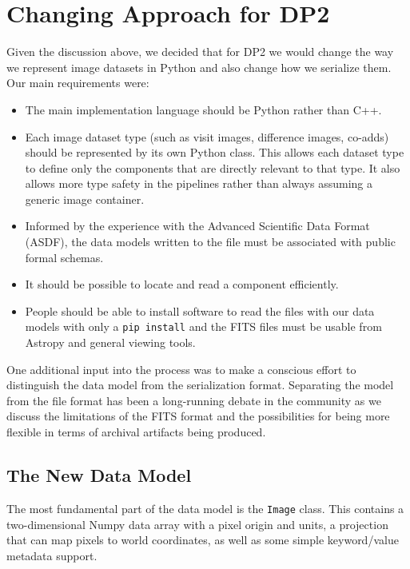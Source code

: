 \section{Changing Approach for DP2}

Given the discussion above, we decided that for DP2 we would change the way we represent image datasets in Python and also change how we serialize them.
Our main requirements were:

\begin{itemize}

  \item The main implementation language should be Python rather than C++.
  \item Each image dataset type (such as visit images, difference images, co-adds) should be represented by its own Python class.
  This allows each dataset type to define only the components that are directly relevant to that type.
  It also allows more type safety in the pipelines rather than always assuming a generic image container.
  \item Informed by the experience with the Advanced Scientific Data Format (ASDF)\cite{2015A&C....12..240G}, the data models written to the file must be associated with public formal schemas.
  \item It should be possible to locate and read a component efficiently.
  \item People should be able to install software to read the files with our data models with only a \texttt{pip install} and the FITS files must be usable from Astropy and general viewing tools.
\end{itemize}

One additional input into the process was to make a conscious effort to distinguish the data model from the serialization format.
Separating the model from the file format has been a long-running debate in the community\cite{2019ASPC..521..733C,2026arXiv260520714S} as we discuss the limitations of the FITS format\cite{2015A&C....12..133T} and the possibilities for being more flexible in terms of archival artifacts being produced.

\subsection{The New Data Model}

The most fundamental part of the data model is the \texttt{Image} class.
This contains a two-dimensional Numpy data array with a pixel origin and units, a projection that can map pixels to world coordinates, as well as some simple keyword/value metadata support.

